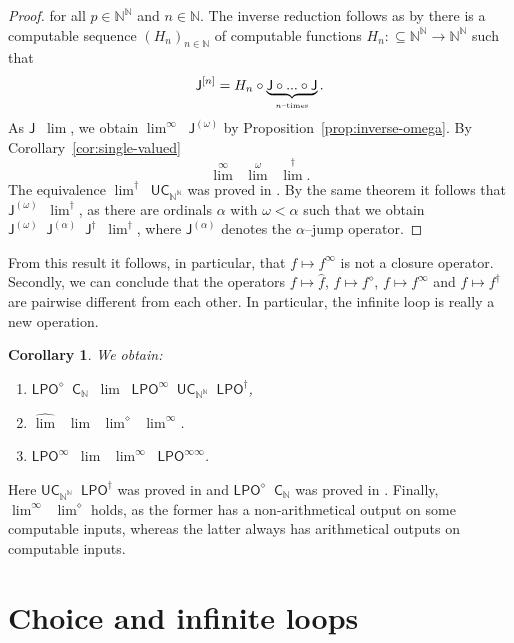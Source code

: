 \documentclass[11pt,a4paper]{amsart}
\theoremstyle{plain}
\newtheorem{cor}[thm]{Corollary}
\theoremstyle{definition}
\theoremstyle{defC}
\theoremstyle{thmC}
\theoremstyle{plain}
\numberwithin{equation}{section}
\def\IN{{\mathbb{N}}}
\def\In{\subseteq}
\def\J{{\mathsf{{J}}}}
\def\U{{\mathsf{{U}}}}
\def\C{{\mathsf{{C}}}}
\def\LPO{\mathsf{LPO}}
\def\C{\mathsf{C}}
\def\leqW{\mathop{\leq_{\mathrm{W}}}}
\def\equivW{\mathop{\equiv_{\mathrm{W}}}}
\def\leqSW{\mathop{\leq_{\mathrm{sW}}}}
\def\equivSW{\mathop{\equiv_{\mathrm{sW}}}}
\def\nleqW{\mathop{\not\leq_{\mathrm{W}}}}
\def\lW{\mathop{<_{\mathrm{W}}}}
\def\leqW{\mathop{\leq_{\mathrm{W}}}}
\def\equivW{\mathop{\equiv_{\mathrm{W}}}}
\def\leqSW{\mathop{\leq_{\mathrm{sW}}}}
\def\equivSW{\mathop{\equiv_{\mathrm{sW}}}}
\def\nleqW{\mathop{\not\leq_{\mathrm{W}}}}
\def\lW{\mathop{<_{\mathrm{W}}}}
\begin{document}
\begin{proof}
for all $p\in\IN^\IN$ and $n\in\IN$.
The inverse reduction follows as by \cite[Theorem~2.14]{Bra18} there is a computable sequence $(H_n)_{n\in\IN}$ of computable
functions $H_n:\In\IN^\IN\to\IN^\IN$ such that
\[\J^{[n]}=H_n\circ\underbrace{\J\circ...\circ\J}_{\mbox{\tiny $n$--times}}.\]
As $\J\equivSW\lim$, we obtain $\lim^\infty\equivSW\J^{(\omega)}$ by Proposition~\ref{prop:inverse-omega}.
By Corollary~\ref{cor:single-valued}
\[\mbox{$\lim^\infty\equivSW\lim^\omega\leqSW\lim^\dagger$}.\]
The equivalence $\lim^\dagger\equivW\U\C_{\IN^\IN}$ was proved in \cite[Theorem~80]{Pau15}.
By the same theorem it follows that $\J^{(\omega)}\lW\lim^\dagger$, as 
there are ordinals $\alpha$ with $\omega<\alpha$ such that we obtain $\J^{(\omega)}\lW\J^{(\alpha)}\leqW\J^\dagger\equivSW\lim^\dagger$, where $\J^{(\alpha)}$ denotes the $\alpha$--jump operator.
\end{proof}

\noindent
From this result it follows, in particular, that $f\mapsto f^\infty$ is not a closure operator.
Secondly, we can conclude that the operators $f\mapsto\widehat{f}$, $f\mapsto f^\diamond$,
$f\mapsto f^\infty$ and $f\mapsto f^\dagger$ are pairwise different from each other.
In particular, the infinite loop is really a new operation.

\begin{cor}
We obtain:
\begin{enumerate}
\item $\LPO^\diamond\equivW\C_\IN\lW\lim\equivSW\LPO^\infty\lW\U\C_{\IN^\IN}\equivW \LPO^\dagger$,
\item $\widehat{\lim}\equivW\lim\lW\lim^\diamond\lW\lim^\infty$.
\item $\LPO^\infty\equivSW\lim\lW\lim^\infty\equivSW\LPO^{\infty\infty}$.
\end{enumerate}
\end{cor}

\noindent
Here $\U\C_{\IN^\IN}\equivW\LPO^\dagger$ was proved in \cite[Theorem~80]{Pau15}
and $\LPO^\diamond\equivW\C_\IN$ was proved in \cite[Proposition~10]{NP18}.
Finally, $\lim^\infty\nleqW\lim^\diamond$ holds, as the former has a non-arithmetical output on
some computable inputs, whereas the latter always has arithmetical outputs on computable inputs.


\section{Choice and infinite loops}
\label{sec:choice}
\end{document}
